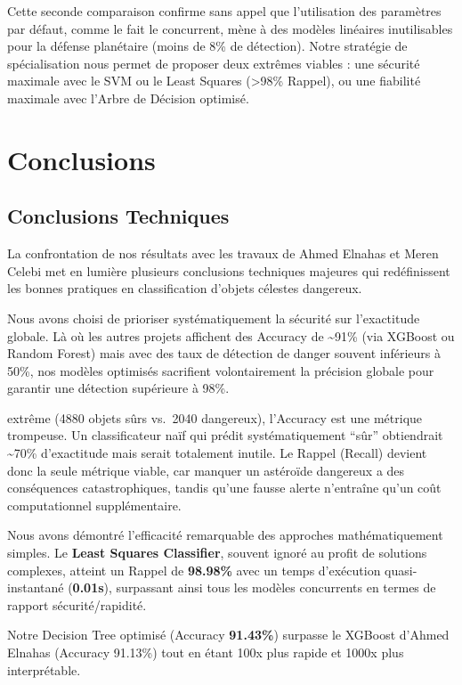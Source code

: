 \documentclass[11pt]{article}
\begin{document}
Cette seconde comparaison confirme sans appel que l'utilisation des
paramètres par défaut, comme le fait le concurrent, mène à des modèles
linéaires inutilisables pour la défense planétaire (moins de 8\% de
détection). Notre stratégie de spécialisation nous permet de proposer
deux extrêmes viables : une sécurité maximale avec le SVM ou le Least
Squares (\textgreater98\% Rappel), ou une fiabilité maximale avec
l'Arbre de Décision optimisé.

\section{Conclusions}\label{conclusions}

\subsection{Conclusions Techniques}\label{conclusions-techniques}

La confrontation de nos résultats avec les travaux de Ahmed Elnahas et
Meren Celebi met en lumière plusieurs conclusions techniques majeures
qui redéfinissent les bonnes pratiques en classification d'objets
célestes dangereux.

Nous avons choisi de prioriser systématiquement la sécurité sur
l'exactitude globale. Là où les autres projets affichent des Accuracy de
\textasciitilde91\% (via XGBoost ou Random Forest) mais avec des taux de
détection de danger souvent inférieurs à 50\%, nos modèles optimisés
sacrifient volontairement la précision globale pour garantir une
détection supérieure à 98\%.

extrême (4880 objets sûrs vs.~2040 dangereux), l'Accuracy est une
métrique trompeuse. Un classificateur naïf qui prédit systématiquement
``sûr'' obtiendrait \textasciitilde70\% d'exactitude mais serait
totalement inutile. Le Rappel (Recall) devient donc la seule métrique
viable, car manquer un astéroïde dangereux a des conséquences
catastrophiques, tandis qu'une fausse alerte n'entraîne qu'un coût
computationnel supplémentaire.

Nous avons démontré l'efficacité remarquable des approches
mathématiquement simples. Le \textbf{Least Squares Classifier}, souvent
ignoré au profit de solutions complexes, atteint un Rappel de
\textbf{98.98\%} avec un temps d'exécution quasi-instantané
(\textbf{0.01s}), surpassant ainsi tous les modèles concurrents en
termes de rapport sécurité/rapidité.

Notre Decision Tree optimisé (Accuracy \textbf{91.43\%}) surpasse le
XGBoost d'Ahmed Elnahas (Accuracy 91.13\%) tout en étant 100x plus
rapide et 1000x plus interprétable.
\end{document}
